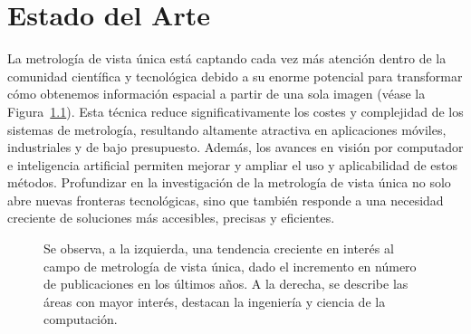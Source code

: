 \chapter{Estado del Arte}
\label{sec:EstadoDelArte}
La metrología de vista única está captando cada vez más atención dentro de la comunidad
científica y tecnológica debido a su enorme potencial para transformar cómo obtenemos información espacial
a partir de una sola imagen (véase la Figura~\ref{fig:ScopusSearch}). Esta técnica reduce
significativamente los costes y complejidad de los sistemas de metrología, resultando
altamente atractiva en aplicaciones móviles, industriales y de bajo presupuesto. Además,
los avances en visión por computador e inteligencia artificial permiten mejorar y ampliar
el uso y aplicabilidad de estos métodos. Profundizar en la investigación de la metrología de vista única
no solo abre nuevas fronteras tecnológicas, sino que también responde a una necesidad creciente de
soluciones más accesibles, precisas y eficientes.
\begin{figure}[htp]
\begin{center}
\end{center}
\caption{Se observa, a la izquierda, una tendencia creciente en interés al campo de metrología de vista única, dado el incremento en número de publicaciones en los últimos años.
A la derecha, se describe las áreas con mayor interés, destacan la ingeniería y ciencia de la computación. }
\label{fig:ScopusSearch}
\end{figure}
